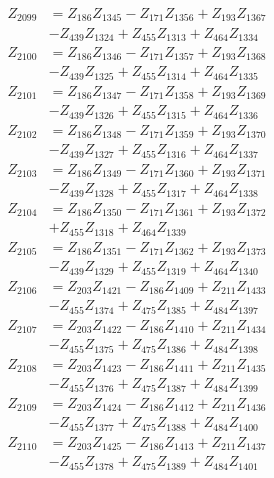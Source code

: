 \begin{multicols}{2}
\begin{align}
Z_{2099} &= Z_{186}Z_{1345} - Z_{171}Z_{1356} + Z_{193}Z_{1367}  \nonumber \\
&- Z_{439}Z_{1324} + Z_{455}Z_{1313} + Z_{464}Z_{1334} \nonumber \\
Z_{2100} &= Z_{186}Z_{1346} - Z_{171}Z_{1357} + Z_{193}Z_{1368}  \nonumber \\
&- Z_{439}Z_{1325} + Z_{455}Z_{1314} + Z_{464}Z_{1335} \nonumber \\
Z_{2101} &= Z_{186}Z_{1347} - Z_{171}Z_{1358} + Z_{193}Z_{1369}  \nonumber \\
&- Z_{439}Z_{1326} + Z_{455}Z_{1315} + Z_{464}Z_{1336} \nonumber \\
Z_{2102} &= Z_{186}Z_{1348} - Z_{171}Z_{1359} + Z_{193}Z_{1370}  \nonumber \\
&- Z_{439}Z_{1327} + Z_{455}Z_{1316} + Z_{464}Z_{1337} \nonumber \\
Z_{2103} &= Z_{186}Z_{1349} - Z_{171}Z_{1360} + Z_{193}Z_{1371}  \nonumber \\
&- Z_{439}Z_{1328} + Z_{455}Z_{1317} + Z_{464}Z_{1338} \nonumber \\
Z_{2104} &= Z_{186}Z_{1350} - Z_{171}Z_{1361} + Z_{193}Z_{1372}  \nonumber \\
&+ Z_{455}Z_{1318} + Z_{464}Z_{1339} \nonumber \\
Z_{2105} &= Z_{186}Z_{1351} - Z_{171}Z_{1362} + Z_{193}Z_{1373}  \nonumber \\
&- Z_{439}Z_{1329} + Z_{455}Z_{1319} + Z_{464}Z_{1340} \nonumber \\
Z_{2106} &= Z_{203}Z_{1421} - Z_{186}Z_{1409} + Z_{211}Z_{1433}  \nonumber \\
&- Z_{455}Z_{1374} + Z_{475}Z_{1385} + Z_{484}Z_{1397} \nonumber \\
Z_{2107} &= Z_{203}Z_{1422} - Z_{186}Z_{1410} + Z_{211}Z_{1434}  \nonumber \\
&- Z_{455}Z_{1375} + Z_{475}Z_{1386} + Z_{484}Z_{1398} \nonumber \\
Z_{2108} &= Z_{203}Z_{1423} - Z_{186}Z_{1411} + Z_{211}Z_{1435}  \nonumber \\
&- Z_{455}Z_{1376} + Z_{475}Z_{1387} + Z_{484}Z_{1399} \nonumber \\
Z_{2109} &= Z_{203}Z_{1424} - Z_{186}Z_{1412} + Z_{211}Z_{1436}  \nonumber \\
&- Z_{455}Z_{1377} + Z_{475}Z_{1388} + Z_{484}Z_{1400} \nonumber \\
Z_{2110} &= Z_{203}Z_{1425} - Z_{186}Z_{1413} + Z_{211}Z_{1437}  \nonumber \\
&- Z_{455}Z_{1378} + Z_{475}Z_{1389} + Z_{484}Z_{1401} \nonumber \\

\end{align}
\end{multicols}
